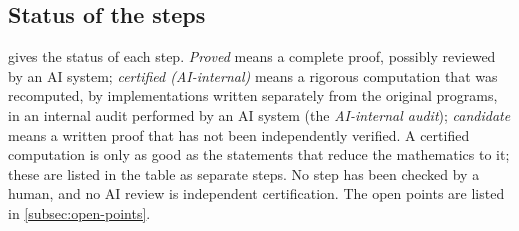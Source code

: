 \subsection{Status of the steps}\label{subsec:status}

 gives the status of each step. \emph{Proved} means a complete proof, possibly
reviewed by an AI system; \emph{certified (AI-internal)} means a rigorous computation that was
recomputed, by implementations written separately from the original programs, in an internal
audit performed by an AI system (the \emph{AI-internal audit}); \emph{candidate} means a written
proof that has not been independently verified. A certified computation is only as good as the
statements that reduce the mathematics to it; these are listed in the table as separate steps.
No step has been checked by a human, and no AI review is independent certification. The open
points are listed in \cref{subsec:open-points}.

